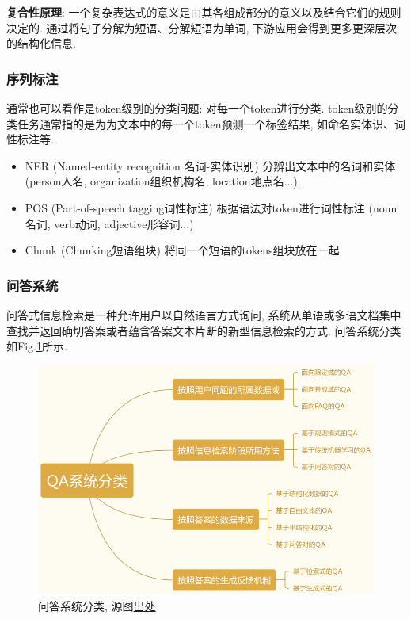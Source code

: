 \textbf{复合性原理}: 一个复杂表达式的意义是由其各组成部分的意义以及结合它们的规则决定的. 通过将句子分解为短语、分解短语为单词, 下游应用会得到更多更深层次的结构化信息. 

\subsubsection{序列标注}
通常也可以看作是token级别的分类问题: 对每一个token进行分类. token级别的分类任务通常指的是为为文本中的每一个token预测一个标签结果, 如命名实体识、词性标注等. 
\begin{itemize}
	\item NER (Named-entity recognition 名词-实体识别) 分辨出文本中的名词和实体 (person人名, organization组织机构名, location地点名...).
	\item POS (Part-of-speech tagging词性标注) 根据语法对token进行词性标注 (noun名词, verb动词, adjective形容词...)
	\item Chunk (Chunking短语组块) 将同一个短语的tokens组块放在一起. 
\end{itemize}

\subsubsection{问答系统}
问答式信息检索是一种允许用户以自然语言方式询问, 系统从单语或多语文档集中查找并返回确切答案或者蕴含答案文本片断的新型信息检索的方式. 问答系统分类如Fig.\ref{fig:qa}所示. 
\begin{figure}[h]
	\centering
	\includegraphics[width=.7\textwidth]{pics/qa.png}
	\caption{问答系统分类, 源图\href{https://blog.csdn.net/sinat_33231573/article/details/83473741}{出处}}
	\label{fig:qa}
\end{figure}










